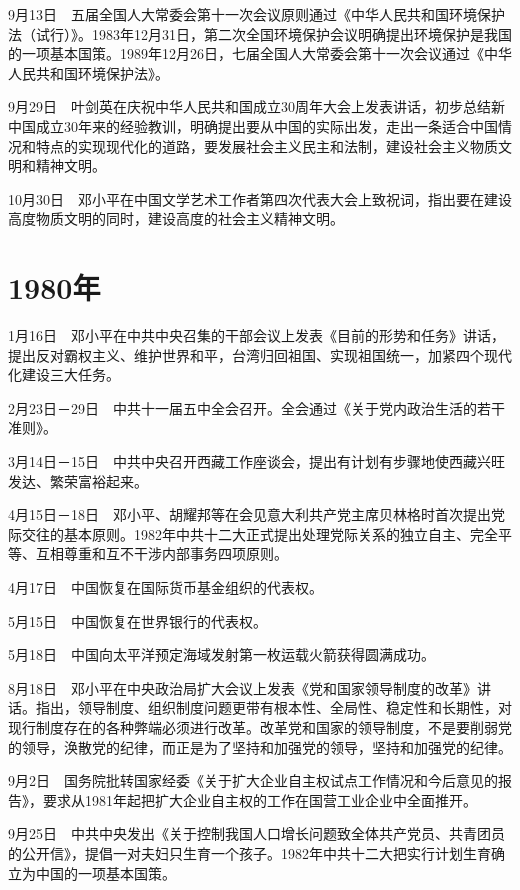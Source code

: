 \documentclass[10pt,a4paper,twocolumn]{book}
\begin{document}
9月13日　五届全国人大常委会第十一次会议原则通过《中华人民共和国环境保护法（试行）》。1983年12月31日，第二次全国环境保护会议明确提出环境保护是我国的一项基本国策。1989年12月26日，七届全国人大常委会第十一次会议通过《中华人民共和国环境保护法》。

9月29日　叶剑英在庆祝中华人民共和国成立30周年大会上发表讲话，初步总结新中国成立30年来的经验教训，明确提出要从中国的实际出发，走出一条适合中国情况和特点的实现现代化的道路，要发展社会主义民主和法制，建设社会主义物质文明和精神文明。

10月30日　邓小平在中国文学艺术工作者第四次代表大会上致祝词，指出要在建设高度物质文明的同时，建设高度的社会主义精神文明。

\section{1980年}

1月16日　邓小平在中共中央召集的干部会议上发表《目前的形势和任务》讲话，提出反对霸权主义、维护世界和平，台湾归回祖国、实现祖国统一，加紧四个现代化建设三大任务。

2月23日－29日　中共十一届五中全会召开。全会通过《关于党内政治生活的若干准则》。

3月14日－15日　中共中央召开西藏工作座谈会，提出有计划有步骤地使西藏兴旺发达、繁荣富裕起来。

4月15日－18日　邓小平、胡耀邦等在会见意大利共产党主席贝林格时首次提出党际交往的基本原则。1982年中共十二大正式提出处理党际关系的独立自主、完全平等、互相尊重和互不干涉内部事务四项原则。

4月17日　中国恢复在国际货币基金组织的代表权。

5月15日　中国恢复在世界银行的代表权。

5月18日　中国向太平洋预定海域发射第一枚运载火箭获得圆满成功。

8月18日　邓小平在中央政治局扩大会议上发表《党和国家领导制度的改革》讲话。指出，领导制度、组织制度问题更带有根本性、全局性、稳定性和长期性，对现行制度存在的各种弊端必须进行改革。改革党和国家的领导制度，不是要削弱党的领导，涣散党的纪律，而正是为了坚持和加强党的领导，坚持和加强党的纪律。

9月2日　国务院批转国家经委《关于扩大企业自主权试点工作情况和今后意见的报告》，要求从1981年起把扩大企业自主权的工作在国营工业企业中全面推开。

9月25日　中共中央发出《关于控制我国人口增长问题致全体共产党员、共青团员的公开信》，提倡一对夫妇只生育一个孩子。1982年中共十二大把实行计划生育确立为中国的一项基本国策。
\end{document}
